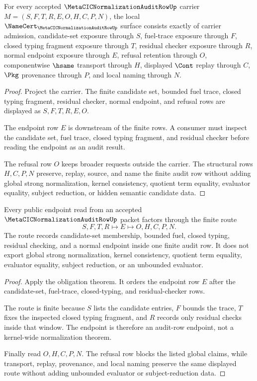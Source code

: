 \begin{theorem}
\label{thm:metacic-normalization-audit-row-obligations}
For every accepted $\MetaCICNormalizationAuditRowUp$ carrier $M=(S,F,T,R,E,O,H,C,P,N)$, the local $\NameCert_{\MetaCICNormalizationAuditRowUp}$ surface consists exactly of carrier admission, candidate-set exposure through $S$, fuel-trace exposure through $F$, closed typing fragment exposure through $T$, residual checker exposure through $R$, normal endpoint exposure through $E$, refusal retention through $O$, componentwise $\hsame$ transport through $H$, displayed $\Cont$ replay through $C$, $\Pkg$ provenance through $P$, and local naming through $N$.
\end{theorem}
\begin{proof}
Project the carrier. The finite candidate set, bounded fuel trace, closed typing fragment, residual checker, normal endpoint, and refusal rows are displayed as $S,F,T,R,E,O$.

The endpoint row $E$ is downstream of the finite rows. A consumer must inspect the candidate set, fuel trace, closed typing fragment, and residual checker before reading the endpoint as an audit result.

The refusal row $O$ keeps broader requests outside the carrier. The structural rows $H,C,P,N$ preserve, replay, source, and name the finite audit row without adding global strong normalization, kernel consistency, quotient term equality, evaluator equality, subject reduction, or hidden semantic candidate data.
\end{proof}

\begin{theorem}
\label{thm:metacic-normalization-audit-row-finite-endpoint-route}
Every public endpoint read from an accepted $\MetaCICNormalizationAuditRowUp$ packet factors through the finite route
$$
S,F,T,R \longmapsto E \longmapsto O,H,C,P,N .
$$
The route records candidate-set membership, bounded fuel, closed typing, residual checking, and a normal endpoint inside one finite audit row. It does not export global strong normalization, kernel consistency, quotient term equality, evaluator equality, subject reduction, or an unbounded evaluator.
\end{theorem}
\begin{proof}
Apply the obligation theorem. It orders the endpoint row $E$ after the candidate-set, fuel-trace, closed-typing, and residual-checker rows.

The route is finite because $S$ lists the candidate entries, $F$ bounds the trace, $T$ fixes the inspected closed typing fragment, and $R$ records only residual checks inside that window. The endpoint is therefore an audit-row endpoint, not a kernel-wide normalization theorem.

Finally read $O,H,C,P,N$. The refusal row blocks the listed global claims, while transport, replay, provenance, and local naming preserve the same displayed route without adding unbounded evaluator or subject-reduction data.
\end{proof}

